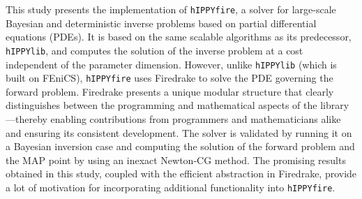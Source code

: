 This study presents the implementation of \texttt{hIPPYfire}, a solver for large-scale Bayesian and deterministic inverse problems based on partial differential equations (PDEs). It is based on the same scalable algorithms as its predecessor, \texttt{hIPPYlib}, and computes the solution of the inverse problem at a cost independent of the parameter dimension. However, unlike \texttt{hIPPYlib} (which is built on FEniCS), \texttt{hIPPYfire} uses Firedrake to solve the PDE governing the forward problem. Firedrake presents a unique modular structure that clearly distinguishes between the programming and mathematical aspects of the library---thereby enabling contributions from programmers and mathematicians alike and ensuring its consistent development. The solver is validated by running it on a Bayesian inversion case and computing the solution of the forward problem and the MAP point by using an inexact Newton-CG method. The promising results obtained in this study, coupled with the efficient abstraction in Firedrake, provide a lot of motivation for incorporating additional functionality into \texttt{hIPPYfire}.
